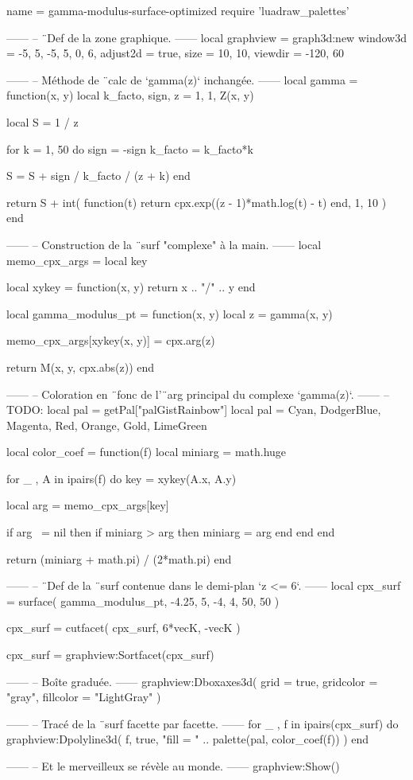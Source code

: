 \documentclass{standalone}
\begin{document}
\begin{luadraw}{name = gamma-modulus-surface-optimized}
require 'luadraw_palettes'

------
-- ¨Def de la zone graphique.
------
local graphview = graph3d:new{
  window3d = {-5, 5, -5, 5, 0, 6},
  adjust2d = true,
  size     = {10, 10},
  viewdir  = {-120, 60}
}

------
-- Méthode de ¨calc de `gamma(z)` inchangée.
------
local gamma = function(x, y)
  local k_facto, sign, z = 1, 1, Z(x, y)

  local S = 1 / z

  for k = 1, 50 do
    sign    = -sign
    k_facto = k_facto*k

    S = S + sign / k_facto / (z + k)
  end

  return S + int(
    function(t)
      return cpx.exp((z - 1)*math.log(t) - t)
    end,
    1, 10
  )
end

------
-- Construction de la ¨surf "complexe" à la main.
------
local memo_cpx_args = {}
local key

local xykey = function(x, y)
    return x .. "/" .. y
end

local gamma_modulus_pt = function(x, y)
  local z = gamma(x, y)

  memo_cpx_args[xykey(x, y)] = cpx.arg(z)

  return M(x, y, cpx.abs(z))
end

------
-- Coloration en ¨fonc de l'¨arg principal du complexe `gamma(z)`.
------
-- TODO: local pal = getPal["palGistRainbow"]
local pal = {Cyan, DodgerBlue, Magenta, Red, Orange, Gold, LimeGreen}

local color_coef = function(f)
  local miniarg = math.huge

  for _ , A in ipairs(f) do
    key = xykey(A.x, A.y)

    local arg = memo_cpx_args[key]

    if arg ~= nil then
      if miniarg > arg then
        miniarg = arg
      end
    end
  end

  return (miniarg + math.pi) / (2*math.pi)
end

------
-- ¨Def de la ¨surf contenue dans le demi-plan `z <= 6`.
------
local cpx_surf = surface(
  gamma_modulus_pt,
  -4.25, 5, -4, 4,
  {50, 50}
)

cpx_surf = cutfacet(
  cpx_surf,
  {6*vecK, -vecK}
)

cpx_surf = graphview:Sortfacet(cpx_surf)

------
-- Boîte graduée.
------
graphview:Dboxaxes3d({
  grid      = true,
  gridcolor = "gray",
  fillcolor = "LightGray"
})

------
-- Tracé de la ¨surf facette par facette.
------
for _ , f in ipairs(cpx_surf) do
  graphview:Dpolyline3d(
    f,
    true,
       "fill = "
    .. palette(pal, color_coef(f))
  )
end

------
-- Et le merveilleux se révèle au monde.
------
graphview:Show()
\end{luadraw}
\end{document}
